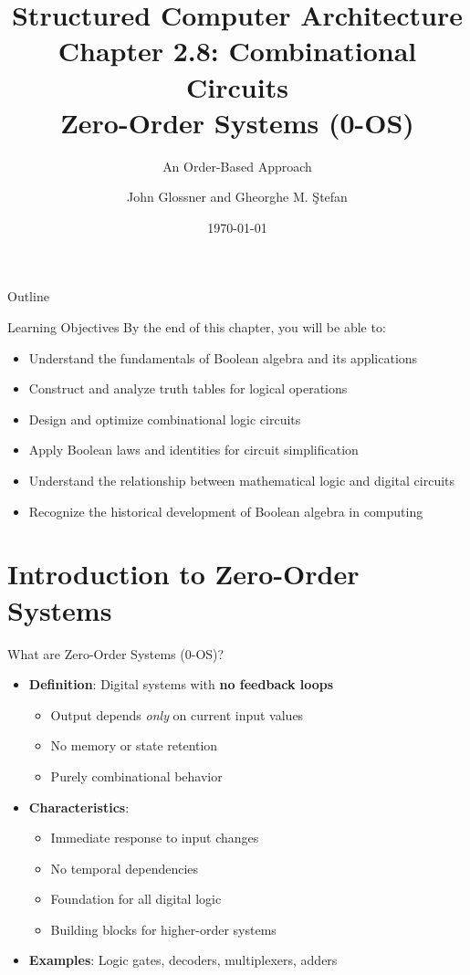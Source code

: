 \documentclass[aspectratio=169,11pt]{beamer}
\title[Chapter 2.8: Combinational Circuits]{Structured Computer Architecture\\Chapter 2.8: Combinational Circuits\\Zero-Order Systems (0-OS)}
\subtitle{An Order-Based Approach}
\author{John Glossner and Gheorghe M. Ştefan}
\institute{Based on the textbook}
\date{\today}
\newcommand{\concept}[1]{\textbf{\color{accentcolor}#1}}
\begin{document}
\begin{frame}
\titlepage
\end{frame}

\begin{frame}{Outline}
\tableofcontents
\end{frame}

\begin{frame}{Learning Objectives}
By the end of this chapter, you will be able to:
\begin{itemize}
\item Understand the fundamentals of Boolean algebra and its applications
\item Construct and analyze truth tables for logical operations
\item Design and optimize combinational logic circuits
\item Apply Boolean laws and identities for circuit simplification
\item Understand the relationship between mathematical logic and digital circuits
\item Recognize the historical development of Boolean algebra in computing
\end{itemize}
\end{frame}

\section{Introduction to Zero-Order Systems}

\begin{frame}{What are Zero-Order Systems (0-OS)?}
\begin{itemize}
\item \concept{Definition}: Digital systems with \textbf{no feedback loops}
\begin{itemize}
\item Output depends \textit{only} on current input values
\item No memory or state retention
\item Purely combinational behavior
\end{itemize}
\vspace{0.5cm}
\item \concept{Characteristics}:
\begin{itemize}
\item Immediate response to input changes
\item No temporal dependencies
\item Foundation for all digital logic
\item Building blocks for higher-order systems
\end{itemize}
\vspace{0.3cm}
\item \concept{Examples}: Logic gates, decoders, multiplexers, adders
\end{itemize}
\end{frame}
\end{document}
